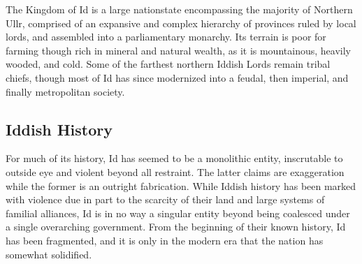 			The Kingdom of Id is a large nationstate encompassing the majority of Northern Ullr, comprised of an expansive and complex hierarchy of provinces ruled by local lords, and assembled into a parliamentary monarchy. Its terrain is poor for farming though rich in mineral and natural wealth, as it is mountainous, heavily wooded, and cold. Some of the farthest northern Iddish Lords remain tribal chiefs, though most of Id has since modernized into a feudal, then imperial, and finally metropolitan society.
	\subsection{Iddish History}
			For much of its history, Id has seemed to be a monolithic entity, inscrutable to outside eye and violent beyond all restraint. The latter claims are exaggeration while the former is an outright fabrication. While Iddish history has been marked with violence due in part to the scarcity of their land and large systems of familial alliances, Id is in no way a singular entity beyond being coalesced under a single overarching government. From the beginning of their known history, Id has been fragmented, and it is only in the modern era that the nation has somewhat solidified. 
